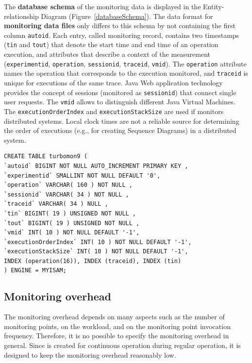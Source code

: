 \documentclass[a4paper,12pt]{scrartcl}
\begin{document}
The \textbf{database schema} of the monitoring data is displayed in the Entity-relationship Diagram (Figure~\ref{databaseSchema}). The data format for \textbf{monitoring data files} only differs to this schema by not containing the first column \texttt{autoid}. Each entry, called monitoring record, contains two timestamps (\texttt{tin} and \texttt{tout}) that denote the start time and end time of an operation execution, and attributes that describe a context of the measurement (\texttt{experimentid}, \texttt{operation}, \texttt{sessionid}, \texttt{traceid}, \texttt{vmid}). The \texttt{operation} attribute names the operation that corresponds to the execution monitored, and \texttt{traceid} is unique for executions of the same trace. %
 Java Web application technology provides the concept of sessions (monitored as \texttt{sessionid}) that connect single user requests. %
The \texttt{vmid} allows to distinguish different Java Virtual Machines. %
The \texttt{executionOrderIndex} and \texttt{executionStackSize} are used if \tpmon{} monitors distributed systems. Local clock times are not a reliable source for determining the order of executions (e.g., for creating Sequence Diagrams) in a distributed system.

\begin{lstlisting}[caption={SQL script for preparing the database table},label={OutputHelloWorld3}]
 CREATE TABLE turbomon9 (
`autoid` BIGINT NOT NULL AUTO_INCREMENT PRIMARY KEY ,
`experimentid` SMALLINT NOT NULL DEFAULT '0',
`operation` VARCHAR( 160 ) NOT NULL ,
`sessionid` VARCHAR( 34 ) NOT NULL ,
`traceid` VARCHAR( 34 ) NULL ,
`tin` BIGINT( 19 ) UNSIGNED NOT NULL ,
`tout` BIGINT( 19 ) UNSIGNED NOT NULL ,
`vmid` INT( 10 ) NOT NULL DEFAULT '-1',
`executionOrderIndex` INT( 10 ) NOT NULL DEFAULT '-1',
`executionStackSize` INT( 10 ) NOT NULL DEFAULT '-1',
INDEX (operation(16)), INDEX (traceid), INDEX (tin)
) ENGINE = MYISAM;
\end{lstlisting}

\subsection{Monitoring overhead}
The monitoring overhead depends on many aspects such as the number of monitoring points, on the workload, and on the monitoring point invocation frequency. Therefore, it is no possible to specify the monitoring overhead in general. Since \tpmon{} is created for continuous operation during regular operation, it is designed to keep the monitoring
overhead reasonably low.
\end{document}
